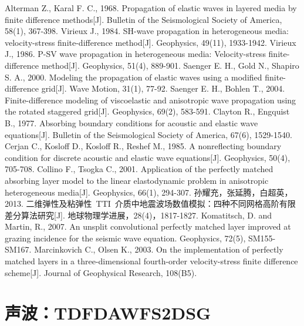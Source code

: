 \documentclass[UTF8]{ctexart}
\renewcommand{\thesection}{\chinese{section}、\kern -1em}                                           %
\begin{document}
\newpage
\begin{thebibliography}{9}
Alterman Z., Karal F. C., 1968. Propagation of elastic waves in layered media by finite difference methods[J]. Bulletin of the Seismological Society of America, 58(1), 367-398.
Virieux J., 1984. SH-wave propagation in heterogeneous media: velocity-stress finite-difference method[J]. Geophysics, 49(11), 1933-1942.
Virieux J., 1986. P-SV wave propagation in heterogeneous media: Velocity-stress finite-difference method[J]. Geophysics, 51(4), 889-901.
Saenger E. H., Gold N., Shapiro S. A., 2000. Modeling the propagation of elastic waves using a modified finite-difference grid[J]. Wave Motion, 31(1), 77-92.
Saenger E. H., Bohlen T., 2004. Finite-difference modeling of viscoelastic and anisotropic wave propagation using the rotated staggered grid[J]. Geophysics, 69(2), 583-591.
Clayton R., Engquist B., 1977. Absorbing boundary conditions for acoustic and elastic wave equations[J]. Bulletin of the Seismological Society of America, 67(6), 1529-1540.
Cerjan C., Kosloff D., Kosloff R., Reshef M., 1985. A nonreflecting boundary condition for discrete acoustic and elastic wave equations[J]. Geophysics, 50(4), 705-708.
Collino F., Tsogka C., 2001. Application of the perfectly matched absorbing layer model to the linear elastodynamic problem in anisotropic heterogeneous media[J]. Geophysics, 66(1), 294-307.
孙耀充，张延腾，白超英，2013. 二维弹性及粘弹性~TTI~介质中地震波场数值模拟：四种不同网格高阶有限差分算法研究[J]. 地球物理学进展，28(4)，1817-1827.
Komatitsch, D. and Martin, R., 2007. An unsplit convolutional perfectly matched layer improved at grazing incidence for the seismic wave equation. Geophysics, 72(5), SM155-SM167.
Marcinkovich C., Olsen K., 2003. On the implementation of perfectly matched layers in a three-dimensional fourth-order velocity-stress finite difference scheme[J]. Journal of Geophysical Research, 108(B5).
\end{thebibliography}

\newpage
\setmonofont{Consolas}                           %
\setsansfont{Consolas}                           %
\setmainfont{Consolas}                           %

\appendix
\renewcommand{\thesection}{附录\kern 0em}
\section{声波：TDFDAWFS2DSG}
\end{document}

